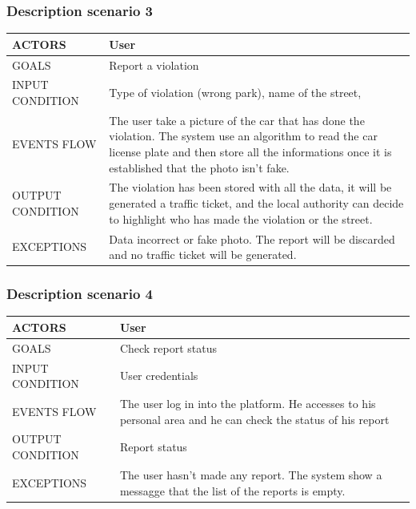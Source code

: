 \subsubsection{Description scenario 3}

\begin{center}
	\begin{tabular}{ | l | p{6cm} | } 
		\hline
		ACTORS & User  \\ 
		\hline
		GOALS & Report a violation  \\ 
		\hline
		INPUT CONDITION & Type of violation (wrong park), name of the street,  \\ 
		\hline
		EVENTS FLOW & The user take a picture of the car that has done the violation. The system use an algorithm to read the car license plate and then store all the informations once it is established that the photo isn't fake.  \\ 
		\hline
		OUTPUT CONDITION & The violation has been stored with all the data, it will be generated a traffic ticket, and the local authority can decide to highlight who has made the violation or the street. \\ 
		\hline
		EXCEPTIONS & Data incorrect or fake photo. The report will be discarded and no traffic ticket will be generated.  \\ 
		\hline
	\end{tabular}
\end{center}

\subsubsection{Description scenario 4}

\begin{center}
	\begin{tabular}{ | l | p{6cm} | } 
		\hline
		ACTORS & User  \\ 
		\hline
		GOALS & Check report status  \\ 
		\hline
		INPUT CONDITION & User credentials  \\ 
		\hline
		EVENTS FLOW & The user log in into the platform. He accesses to his personal area and he can check the status of his report \\ 
		\hline
		OUTPUT CONDITION & Report status \\ 
		\hline
		EXCEPTIONS & The user hasn't made any report. The system show a messagge that the list of the reports is empty.  \\ 
		\hline
	\end{tabular}
\end{center}

